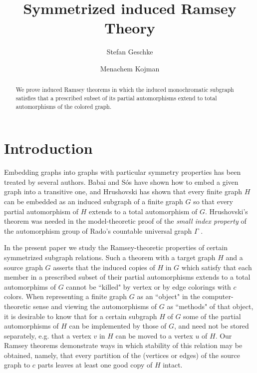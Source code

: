 \documentclass[11pt]{amsart}
\title{Symmetrized induced Ramsey Theory}
\author{Stefan Geschke}
\author{Menachem Kojman}
\begin{document}
\maketitle

\begin{abstract} We prove induced Ramsey theorems in which the induced
monochromatic subgraph satisfies that a prescribed subset of its
partial
automorphisms extend to total automorphisms of the colored graph.
\end{abstract}

\section{Introduction}


Embedding graphs into graphs with particular symmetry properties has
been
treated by several authors. Babai and S\'os \cite{BS} have shown how
to
embed a given graph into a transitive one, and Hrushovski \cite{H} has
shown that every finite graph $H$ can be embedded as an induced
subgraph
of a finite graph $G$ so that every partial automorphism of $H$
extends
to a total automorphism of $G$. Hrushovski's theorem was needed
in the model-theoretic proof of the \emph{small index property} of the
automorphism group of Rado's
countable universal graph $\Gamma$ \cite{HHLS}.

In the present paper we study the Ramsey-theoretic properties of
certain
symmetrized subgraph relations. Such a theorem with a target graph $H$
and
a source graph $G$ asserts that the induced copies of $H$ in $G$ which
satisfy that each member in a prescribed subset of their partial
automorphisms extends to a total automorphims of $G$ cannot be
``killed" by
vertex or by edge colorings with $c$ colors. When representing a
finite
graph $G$ as an ``object" in the computer-theoretic sense and viewing
the
automorphisms of $G$ as ``methods" of that object, it is desirable to
know
that for a certain subgraph $H$ of $G$ some of the partial
automorphisms
of $H$ can be implemented by those of $G$, and need not be stored
separately, e.g. that a vertex $v$ in $H$ can be moved to a vertex $u$
of
$H$. Our Ramsey theorems demonstrate ways in which stability
of this relation may be obtained, namely, that every partition of the
(vertices or edges) of the source graph to $c$ parts leaves at
least one good copy of $H$ intact.
\end{document}
